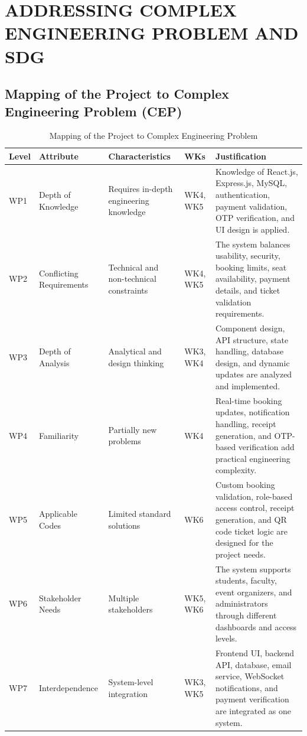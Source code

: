 \documentclass[12pt]{report}
\begin{document}
\setcounter{chapter}{6}
\chapter{ADDRESSING COMPLEX ENGINEERING PROBLEM AND SDG}
\linespread{1.5}

\section{Mapping of the Project to Complex Engineering Problem (CEP)}

\begin{table}[H]
\centering
\caption{Mapping of the Project to Complex Engineering Problem}
\renewcommand{\arraystretch}{1.25}
\begin{tabular}{|p{1.4cm}|p{2.7cm}|p{3.5cm}|p{2cm}|p{5.5cm}|}
\hline
\rowcolor{gray!30}
\textbf{Level} & \textbf{Attribute} & \textbf{Characteristics} & \textbf{WKs} & \textbf{Justification}\\
\hline
WP1 & Depth of Knowledge & Requires in-depth engineering knowledge & WK4, WK5 & Knowledge of React.js, Express.js, MySQL, authentication, payment validation, OTP verification, and UI design is applied.\\
\hline
WP2 & Conflicting Requirements & Technical and non-technical constraints & WK4, WK5 & The system balances usability, security, booking limits, seat availability, payment details, and ticket validation requirements.\\
\hline
WP3 & Depth of Analysis & Analytical and design thinking & WK3, WK4 & Component design, API structure, state handling, database design, and dynamic updates are analyzed and implemented.\\
\hline
WP4 & Familiarity & Partially new problems & WK4 & Real-time booking updates, notification handling, receipt generation, and OTP-based verification add practical engineering complexity.\\
\hline
WP5 & Applicable Codes & Limited standard solutions & WK6 & Custom booking validation, role-based access control, receipt generation, and QR code ticket logic are designed for the project needs.\\
\hline
WP6 & Stakeholder Needs & Multiple stakeholders & WK5, WK6 & The system supports students, faculty, event organizers, and administrators through different dashboards and access levels.\\
\hline
WP7 & Interdependence & System-level integration & WK3, WK5 & Frontend UI, backend API, database, email service, WebSocket notifications, and payment verification are integrated as one system.\\
\hline
\end{tabular}
\end{table}
\end{document}
